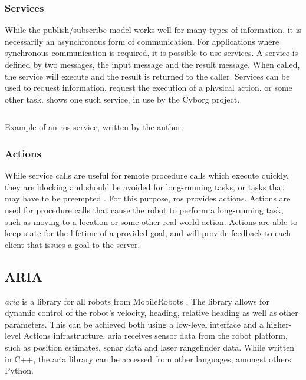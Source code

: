 \documentclass[\rootfolder/main.tex]{subfiles}
\begin{document}
\subsubsection{Services}

While the publish/subscribe model works well for many types of information, it is necessarily an asynchronous form of communication.
For applications where synchronous communication is required, it is possible to use services.
A service is defined by two messages, the input message and the result message.
When called, the service will execute and the result is returned to the caller.
Services can be used to request information, request the execution of a physical action, or some other task.
 shows one such service, in use by the Cyborg project.

\begin{listing}
    \inputminted{python}{\rootfolder/Chapters/Chapter2/Listings/distance_to_goal.py}
    \caption{Example of an \acrshort{ros} service, written by the author.}
    \label{lst:ros_service}
\end{listing}

\subsubsection{Actions}

While service calls are useful for remote procedure calls which execute quickly, they are blocking and should be avoided for long-running tasks, or tasks that may have to be preempted \cite{ROS}.
For this purpose, \acrshort{ros} provides actions.
Actions are used for procedure calls that cause the robot to perform a long-running task, such as moving to a location or some other real-world action.
Actions are able to keep state for the lifetime of a provided goal, and will provide feedback to each client that issues a goal to the server.

\subsection{ARIA}

\emph{\acrfull{aria}} is a \CC library for all robots from MobileRobots \cite{ARIA}.
The library allows for dynamic control of the robot's velocity, heading, relative heading as well as other parameters.
This can be achieved both using a low-level interface and a higher-level Actions infrastructure.
\acrshort{aria} receives sensor data from the robot platform, such as position estimates, sonar data and laser rangefinder data.
While written in C++, the \acrshort{aria} library can be accessed from other languages, amongst others Python.
\end{document}
